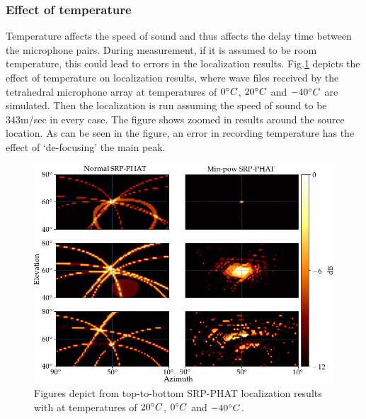 \subsubsection{Effect of temperature}
Temperature affects the speed of sound and thus affects the delay time between the microphone pairs. During measurement, if it is assumed to be room temperature, this could lead to errors in the localization results. Fig.\ref{fig:4mic1srcTemp} depicts the effect of temperature on localization results, where wave files received by the tetrahedral microphone array at temperatures of $0\degree C$, $20\degree C$ and $-40\degree C$ are simulated. Then the localization is run assuming the speed of sound to be 343m/sec in every case. The figure shows zoomed in results around the source location. As can be seen in the figure, an error in recording temperature has the effect of `de-focusing' the main peak.
\begin{figure}[H]
\centering
\includegraphics[width=\textwidth]{Figures/tempSim.png}
\caption{Figures depict from top-to-bottom SRP-PHAT localization results with at temperatures of $20\degree C$, $0\degree C$ and $-40\degree C$.}
\label{fig:4mic1srcTemp}
\end{figure}
